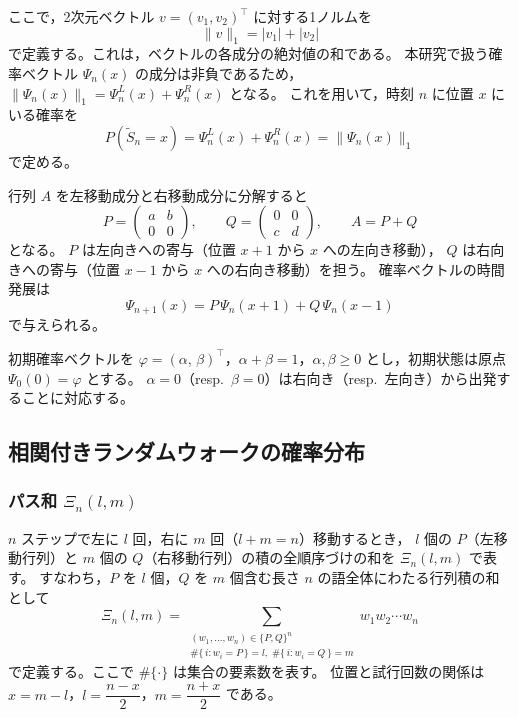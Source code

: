 \documentclass[a4j,dvipdfmx]{jsarticle}
\theoremstyle{plainnote}
\begin{document}
ここで，2次元ベクトル $v = (v_1, v_2)^\top$ に対する1ノルムを
\begin{equation}
  \|v\|_1 = |v_1| + |v_2|
  \label{eq:l1_norm}
\end{equation}
で定義する。これは，ベクトルの各成分の絶対値の和である。
本研究で扱う確率ベクトル $\Psi_n(x)$ の成分は非負であるため，
$\|\Psi_n(x)\|_1 = \Psi_n^L(x) + \Psi_n^R(x)$ となる。
これを用いて，時刻 $n$ に位置 $x$ にいる確率を
\[
  P(\tilde{S}_n = x) = \Psi_n^L(x) + \Psi_n^R(x) = \|\Psi_n(x)\|_1
\]
で定める。

行列 $A$ を左移動成分と右移動成分に分解すると
\[
  P = \begin{pmatrix} a & b \\ 0 & 0 \end{pmatrix}, \qquad
  Q = \begin{pmatrix} 0 & 0 \\ c & d \end{pmatrix}, \qquad
  A = P + Q
\]
となる。
$P$ は左向きへの寄与（位置 $x+1$ から $x$ への左向き移動），
$Q$ は右向きへの寄与（位置 $x-1$ から $x$ への右向き移動）を担う。
確率ベクトルの時間発展は
\begin{equation}
  \Psi_{n+1}(x) = P\,\Psi_n(x+1) + Q\,\Psi_n(x-1)
  \label{eq:crw_evolution}
\end{equation}
で与えられる。

初期確率ベクトルを
$\varphi = (\alpha,\,\beta)^\top$，$\alpha + \beta = 1$，$\alpha,\beta \geq 0$
とし，初期状態は原点 $\Psi_0(0) = \varphi$ とする。
$\alpha = 0$（resp.\ $\beta = 0$）は右向き（resp.\ 左向き）から出発することに対応する。

\subsection{相関付きランダムウォークの確率分布}

\subsubsection*{パス和 $\Xi_n(l,m)$}

$n$ ステップで左に $l$ 回，右に $m$ 回（$l + m = n$）移動するとき，
$l$ 個の $P$（左移動行列）と $m$ 個の $Q$（右移動行列）の積の全順序づけの和を
$\Xi_n(l, m)$ で表す。
すなわち，$P$ を $l$ 個，$Q$ を $m$ 個含む長さ $n$ の語全体にわたる行列積の和として
\begin{equation}
  \Xi_n(l, m)
  = \sum_{\substack{(w_1,\ldots,w_n)\in\{P,Q\}^n \\
        \#\{\,i : w_i = P\,\}=l,\;\#\{\,i : w_i = Q\,\}=m}}
    w_1 w_2 \cdots w_n
  \label{eq:path_sum}
\end{equation}
で定義する。ここで $\#\{\cdot\}$ は集合の要素数を表す。
位置と試行回数の関係は $x = m - l$，$l = \dfrac{n-x}{2}$，$m = \dfrac{n+x}{2}$ である。
\end{document}
